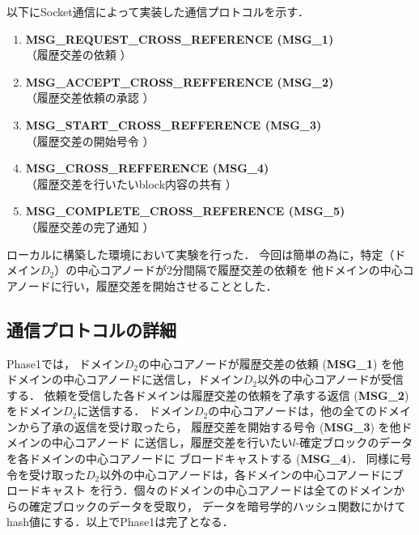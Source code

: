 \documentclass[a4paper,12pt]{jsarticle}
\begin{document}
以下にSocket通信によって実装した通信プロトコルを示す．

\hspace{5mm}
%
\begin{enumerate}
\item \textbf{MSG\_REQUEST\_CROSS\_REFERENCE (MSG\_1)}\\
\hspace{12mm} （履歴交差の依頼 ）
\item \textbf{MSG\_ACCEPT\_CROSS\_REFFERENCE (MSG\_2)}\\
\hspace{12mm}  （履歴交差依頼の承認 ）
  \item \textbf{MSG\_START\_CROSS\_REFFERENCE (MSG\_3)}\\
\hspace{12mm}  （履歴交差の開始号令 ）
  \item \textbf{MSG\_CROSS\_REFFERENCE (MSG\_4)}\\
\hspace{12mm}  （履歴交差を行いたいblock内容の共有 ）
  \item \textbf{MSG\_COMPLETE\_CROSS\_REFERENCE (MSG\_5)} \\
\hspace{12mm}  （履歴交差の完了通知 ）
\end{enumerate}
%
\hspace{5mm}

ローカルに構築した環境において実験を行った．
今回は簡単の為に，特定（ドメイン$D_2$）の中心コアノードが2分間隔で履歴交差の依頼を
他ドメインの中心コアノードに行い，履歴交差を開始させることとした．

\subsection{通信プロトコルの詳細}
Phase1では，
ドメイン$D_2$の中心コアノードが履歴交差の依頼 (\textbf{MSG\_1})
を他ドメインの中心コアノードに送信し，ドメイン$D_2$以外の中心コアノードが受信する．
依頼を受信した各ドメインは履歴交差の依頼を了承する返信 (\textbf{MSG\_2})
をドメイン$D_2$に送信する．
ドメイン$D_2$の中心コアノードは，他の全てのドメインから了承の返信を受け取ったら，
履歴交差を開始する号令 (\textbf{MSG\_3}) を他ドメインの中心コアノード
に送信し，履歴交差を行いたい$l$-確定ブロックのデータを各ドメインの中心コアノードに
ブロードキャストする (\textbf{MSG\_4})．
同様に号令を受け取った$D_2$以外の中心コアノードは，各ドメインの中心コアノードにブロードキャスト
を行う．個々のドメインの中心コアノードは全てのドメインからの確定ブロックのデータを受取り，
データを暗号学的ハッシュ関数にかけてhash値にする．以上でPhase1は完了となる．
\end{document}
